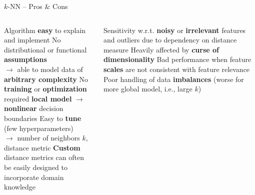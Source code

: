 \begin{frame}{$k$-NN -- Pros \& Cons}

\footnotesize

\begin{columns}[onlytextwidth]
  \begin{column}{0.5\textwidth}
    \footnotesize
    \begin{itemize}
      \positem Algorithm \textbf{easy} to explain and implement
      \positem No distributional or functional \textbf{assumptions}\\
      $\rightarrow$ able to model data of \textbf{arbitrary complexity} %
      \positem No \textbf{training} or \textbf{optimization} required 
      \positem \textbf{local model} $\rightarrow$ \textbf{nonlinear} decision boundaries
      \positem Easy to \textbf{tune} (few hyperparameters)\\
      $\rightarrow$ number of neighbors $k$, distance metric
      \positem \textbf{Custom} distance metrics can often be easily designed to incorporate domain knowledge
    \end{itemize}
  \end{column}
  \begin{column}{0.5\textwidth}
    \footnotesize
    \begin{itemize}
      \negitem Sensitivity w.r.t. \textbf{noisy} or \textbf{irrelevant} features and outliers due to dependency on distance measure
      \negitem Heavily affected by \textbf{curse of dimensionality}
      \negitem Bad performance when feature \textbf{scales} are not consistent with feature relevance
      \negitem Poor handling of data \textbf{imbalances} (worse for more global model, i.e., large $k$)
    \end{itemize}
  \end{column}
\end{columns}

\end{frame}